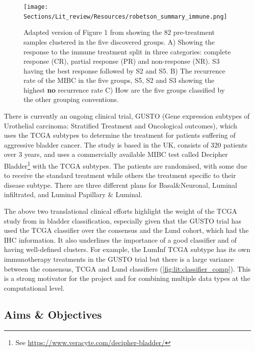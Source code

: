 \begin{figure}[!htb]    
    \centering
    \texttt{[image: Sections/Lit\_review/Resources/robetson\_summary\_immune.png]}
    \caption{Adapted version of Figure 1 from \cite{Robertson2023-na} showing the 82 pre-treatment samples clustered in the five discovered groups. A) Showing the response to the immune treatment split in three categories: complete response (CR), partial response (PR) and non-response (NR). S3 having the best response followed by S2 and S5. B) The recurrence rate of the MIBC in the five groups, S5, S2 and S3 showing the highest \textbf{no} recurrence rate C) How are the five groups classified by the other grouping conventions.}
    \label{fig:lit:immune_rob}
\end{figure}


There is currently an ongoing clinical trial, GUSTO (Gene expression subtypes of Urothelial carcinoma: Stratified Treatment and Oncological outcomes), which uses the TCGA subtypes to determine the treatment for patients suffering of aggressive bladder cancer. The study is based in the UK, consists of 320 patients over 3 years, and uses a commercially available MIBC test called Decipher Bladder\footnote{See \url{https://www.veracyte.com/decipher-bladder/}} with the TCGA subtypes\cite{Griffin2024-zr}. The patients are randomised, with some  due to receive the standard treatment while others the treatment specific to their disease subtype. There are three different plans for Basal\&Neuronal, Luminal infiltrated, and Luminal Papillary \& Luminal.

The above two translational clinical efforts highlight the weight of the TCGA study from \citet{Robertson2017-mg} in bladder classification, especially given that the GUSTO trial has used the TCGA classifier over the consensus and the Lund cohort, which had the IHC information. It also underlines the importance of a good classifier and of having well-defined clusters. For example, the LumInf TCGA subtype has its own immunotherapy treatments in the GUSTO trial \citet{Griffin2024-zr} but there is a large variance between the consensus, TCGA and Lund classifiers (\cref{fig:lit:classifier_comp}). This is a strong motivator for the project and for combining multiple data types at the computational level.



\subsection{Aims \& Objectives} \label{s:lit:aims_objs}


